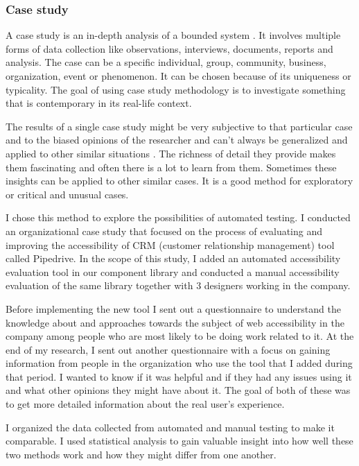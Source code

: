 \documentclass{master_thesis}
\begin{document}



\subsubsection{Case study}

A case study is an in-depth analysis of a bounded system \citep{Range2023}. It involves multiple forms of data collection like observations, interviews, documents, reports and analysis. The case can be a specific individual, group, community, business, organization, event or phenomenon. It can be chosen because of its uniqueness or typicality. The goal of using case study methodology is to investigate something that is contemporary in its real-life context.

The results of a single case study might be very subjective to that particular case and to the biased opinions of the researcher and can't always be generalized and applied to other similar situations \citep{Range2023}. The richness of detail they provide makes them fascinating and often there is a lot to learn from them. Sometimes these insights can be applied to other similar cases. It is a good method for exploratory or critical and unusual cases.

I chose this method to explore the possibilities of automated testing. I conducted an organizational case study that focused on the process of evaluating and improving the accessibility of CRM (customer relationship management) tool called Pipedrive. In the scope of this study, I added an automated accessibility evaluation tool in our component library and conducted a manual accessibility evaluation of the same library together with 3 designers working in the company.

Before implementing the new tool I sent out a questionnaire to understand the knowledge about and approaches towards the subject of web accessibility in the company among people who are most likely to be doing work related to it. At the end of my research, I sent out another questionnaire with a focus on gaining information from people in the organization who use the tool that I added during that period. I wanted to know if it was helpful and if they had any issues using it and what other opinions they might have about it. The goal of both of these was to get more detailed information about the real user's experience.

I organized the data collected from automated and manual testing to make it comparable. I used statistical analysis to gain valuable insight into how well these two methods work and how they might differ from one another.
\end{document}
